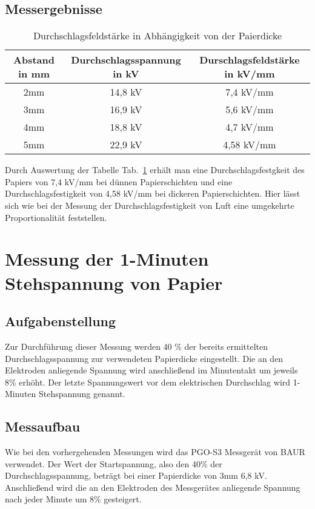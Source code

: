\documentclass[a4paper,twoside,12pt,DIV=13,BCOR=5mm,numbers=noenddot,cleardoublepage=empty]{scrbook}
\begin{document}
		\subsection{Messergebnisse}
		\begin{table}[h]
			\begin{center}
				\begin{tabular}{|c||c|c|}
					\hline
					Abstand in mm & Durchschlagsspannung in kV & Durschlagsfeldst\"arke in kV/mm \\
					\hline
					\hline
					2mm & 14,8 kV & 7,4 kV/mm \\
					\hline
					3mm & 16,9 kV & 5,6 kV/mm \\
					\hline
					4mm & 18,8 kV & 4,7 kV/mm \\
					\hline
					5mm & 22,9 kV & 4,58 kV/mm \\
					\hline				
				\end{tabular}
			\caption{Durchschlagsfeldst\"arke in Abh\"angigkeit von der Paierdicke}
			\label{tab:table2}
			\end{center}
		\end{table}
		Durch Auswertung der Tabelle Tab.~\ref{tab:table2} erh\"alt man eine Durchschlagsfestgkeit des Papiers von 7,4 kV/mm bei d\"unnen Papierschichten und eine Durchschlagsfestigkeit von 4,58 kV/mm bei dickeren Papierschichten.
		Hier l\"asst sich wie bei der Messung der Durchschlagsfestigkeit von Luft eine umgekehrte Proportionalit\"at feststellen. 
		
		
	\section{Messung der 1-Minuten Stehspannung von Papier}
	
		\subsection{Aufgabenstellung}
		Zur Durchf\"uhrung dieser Messung werden 40 \% der bereits ermittelten Durchschlagsspannung zur verwendeten Papierdicke eingestellt. 
		Die an den Elektroden anliegende Spannung wird anschlie\ss{}end im Minutentakt um jeweils 8\% erh\"oht. 
		Der letzte Spannungswert vor dem elektrischen Durchschlag wird 1-Minuten Stehspannung genannt. 
		\subsection{Messaufbau}
		Wie bei den vorhergehenden Messungen wird das PGO-S3 Messger\"at von BAUR verwendet. 
		Der Wert der Startspannung, also den 40\% der Durchschlagsspannung, betr\"agt bei einer Papierdicke von 3mm 6,8 kV.
		Anschlie\ss{}end wird die an den Elektroden des Messger\"ates anliegende Spannung nach jeder Minute um 8\% gesteigert. 
\end{document}
